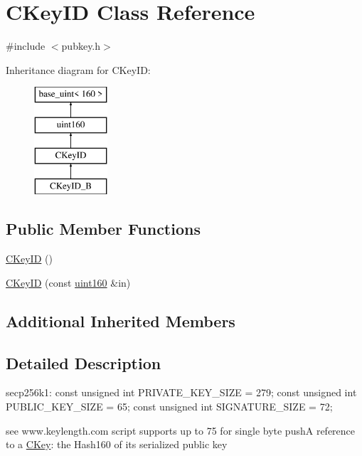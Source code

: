 \hypertarget{class_c_key_i_d}{}\section{C\+Key\+I\+D Class Reference}
\label{class_c_key_i_d}


{\ttfamily \#include $<$pubkey.\+h$>$}

Inheritance diagram for C\+Key\+I\+D\+:\begin{figure}[H]
\begin{center}
\leavevmode
\includegraphics[height=4.000000cm]{class_c_key_i_d}
\end{center}
\end{figure}
\subsection*{Public Member Functions}
\begin{DoxyCompactItemize}
\item 
\hyperlink{class_c_key_i_d_a01dbd3c37820a2ffe89d106c6a7cf53d}{C\+Key\+I\+D} ()
\item 
\hyperlink{class_c_key_i_d_a695f373e11730318f9103100fa006a7e}{C\+Key\+I\+D} (const \hyperlink{classuint160}{uint160} \&in)
\end{DoxyCompactItemize}
\subsection*{Additional Inherited Members}


\subsection{Detailed Description}
secp256k1\+: const unsigned int P\+R\+I\+V\+A\+T\+E\+\_\+\+K\+E\+Y\+\_\+\+S\+I\+Z\+E = 279; const unsigned int P\+U\+B\+L\+I\+C\+\_\+\+K\+E\+Y\+\_\+\+S\+I\+Z\+E = 65; const unsigned int S\+I\+G\+N\+A\+T\+U\+R\+E\+\_\+\+S\+I\+Z\+E = 72;

see www.\+keylength.\+com script supports up to 75 for single byte push\+A reference to a \hyperlink{class_c_key}{C\+Key}\+: the Hash160 of its serialized public key 

